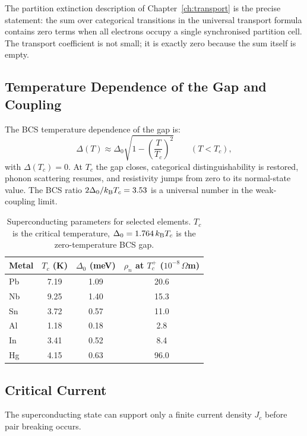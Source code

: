 The partition extinction description of Chapter~\ref{ch:transport} is the
precise statement: the sum over categorical transitions in the universal
transport formula contains zero terms when all electrons occupy a single
synchronised partition cell.  The transport coefficient is not small; it
is exactly zero because the sum itself is empty.

\subsection{Temperature Dependence of the Gap and Coupling}

The BCS temperature dependence of the gap is:
\begin{equation}
  \Delta(T) \approx \Delta_0\sqrt{1 - \left(\frac{T}{T_c}\right)^2}
    \qquad (T < T_c),
  \label{eq:ch18-bcsgap-t}
\end{equation}
with $\Delta(T_c) = 0$.  At $T_c$ the gap closes, categorical
distinguishability is restored, phonon scattering resumes, and resistivity
jumps from zero to its normal-state value.  The BCS ratio $2\Delta_0/k_{\mathrm{B}} T_c
= 3.53$ is a universal number in the weak-coupling limit.

\begin{table}[htbp]
  \centering
  \caption{Superconducting parameters for selected elements.
    $T_c$ is the critical temperature, $\Delta_0 = 1.764\,k_{\mathrm{B}} T_c$ is the
    zero-temperature BCS gap.}
  \label{tab:ch18-supercond}
  \begin{tabular}{lccc}
    \toprule
    Metal & $T_c$ (K) & $\Delta_0$ (meV) & $\rho_n$ at $T_c^+$
      ($10^{-8}$\,$\Omega$m) \\
    \midrule
    Pb & 7.19  & 1.09 & 20.6 \\
    Nb & 9.25  & 1.40 & 15.3 \\
    Sn & 3.72  & 0.57 & 11.0 \\
    Al & 1.18  & 0.18 &  2.8 \\
    In & 3.41  & 0.52 &  8.4 \\
    Hg & 4.15  & 0.63 & 96.0 \\
    \bottomrule
  \end{tabular}
\end{table}

\subsection{Critical Current}

The superconducting state can support only a finite current density $J_c$
before pair breaking occurs.

